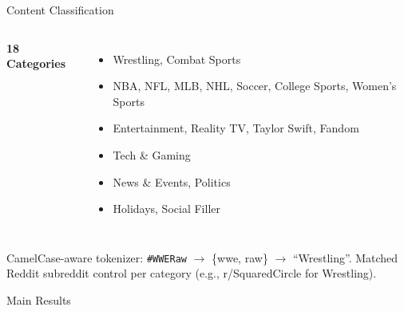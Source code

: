 \documentclass[aspectratio=169]{beamer}
\begin{document}
\begin{frame}{Content Classification}

\begin{columns}[t]
    \textbf{18 Categories}
    \begin{itemize}\small
        \item Wrestling, Combat Sports
        \item NBA, NFL, MLB, NHL, Soccer, College Sports, Women's Sports
        \item Entertainment, Reality TV, Taylor Swift, Fandom
        \item Tech \& Gaming
        \item News \& Events, Politics
        \item Holidays, Social Filler
    \end{itemize}

\end{columns}

\vspace{0.3em}
\small CamelCase-aware tokenizer: \texttt{\#WWERaw} $\to$ \{wwe, raw\} $\to$ ``Wrestling''.
Matched Reddit subreddit control per category (e.g., r/SquaredCircle for Wrestling).
\end{frame}

\begin{frame}{Main Results}

\begin{center}
\end{center}
\end{frame}
\end{document}
